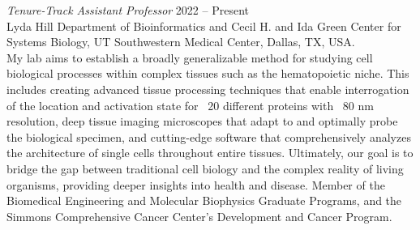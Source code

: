 {\sl Tenure-Track Assistant Professor} \hfill 2022 -- Present \\ 
Lyda Hill Department of Bioinformatics and Cecil H. and Ida Green Center for Systems Biology, UT Southwestern Medical Center, Dallas, TX, USA. \hfill \\
\forceindent My lab aims to establish a broadly generalizable method for studying cell biological processes within complex tissues such as the hematopoietic niche. This includes creating advanced tissue processing techniques that enable interrogation of the location and activation state for ~20 different proteins with ~80 nm resolution, deep tissue imaging microscopes that adapt to and optimally probe the biological specimen, and cutting-edge software that comprehensively analyzes the architecture of single cells throughout entire tissues. Ultimately, our goal is to bridge the gap between traditional cell biology and the complex reality of living organisms, providing deeper insights into health and disease. Member of the Biomedical Engineering and Molecular Biophysics Graduate Programs, and the Simmons Comprehensive Cancer Center's Development and Cancer Program.



